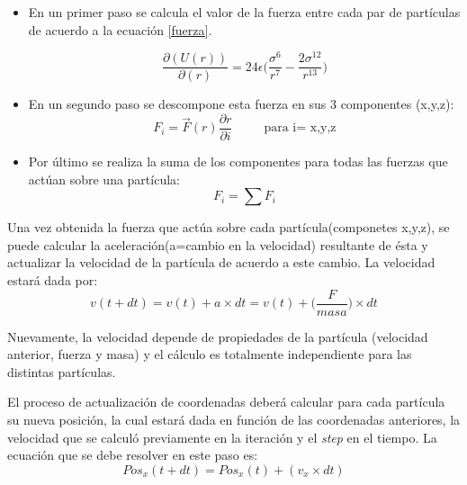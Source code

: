 \begin{itemize}
\item En un primer paso se calcula el valor de la fuerza entre cada par de partículas de acuerdo a la ecuación \ref{fuerza}.

\begin{equation} 
  \dfrac{\partial(U(r)) }{ \partial(r)}  =  24\epsilon \bigg(\dfrac{{\sigma}^{6}}{{r}^{7}} - \dfrac{2{\sigma}^{12}} {{r}^{13}}\bigg)
\end{equation}


\item En un segundo paso se descompone esta fuerza en sus 3 componentes (x,y,z): \begin{equation}                                                                                
F_i=\vec{F}(r)\dfrac{\partial r}{\partial i}  \hspace{30pt} \text{para i= x,y,z}
                                                                                 \end{equation}

\item Por último se realiza la suma de los componentes para todas las fuerzas que actúan sobre una partícula: 
\begin{equation}
F_i=\sum F_i
\end{equation}

\end{itemize}



Una vez obtenida la fuerza que actúa sobre cada partícula(componetes x,y,z), se puede calcular la aceleración(a=cambio en la velocidad) resultante de ésta y actualizar la velocidad de la partícula de acuerdo a este cambio.
La velocidad estará dada por:
 \begin{equation} 
    v(t+dt)= v(t) + a\times dt =  v(t) + \bigg(\frac{F}{masa}\bigg)\times dt
 \end{equation}

Nuevamente, la velocidad depende de propiedades de la partícula (velocidad anterior, fuerza y masa) y el cálculo es totalmente independiente para las distintas partículas.  


El proceso de actualización de coordenadas deberá calcular para cada partícula su nueva posición, la cual estará dada en función de las coordenadas anteriores, la velocidad que se calculó previamente en la iteración y el \textit{step} en el tiempo. 
La ecuación que se debe resolver en este paso es:
\begin{equation} 
    Pos_x(t+dt)= Pos_x(t) + (v_x \times dt)
\end{equation}

